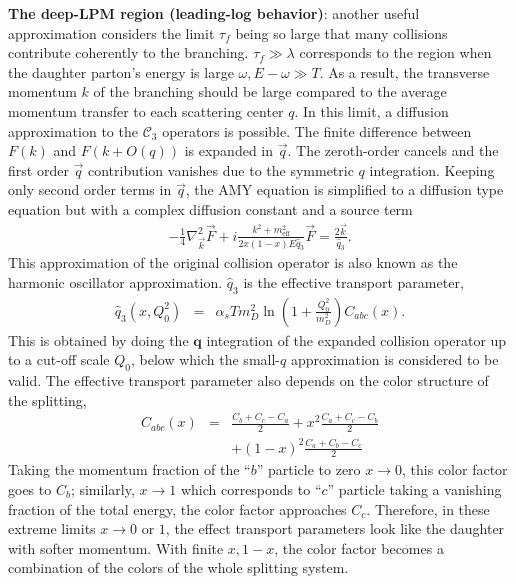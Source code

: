 {\bf The deep-LPM region (leading-log behavior)}: another useful approximation considers the limit $\tau_f$ being so large that many collisions contribute coherently to the branching. 
$\tau_f \gg \lambda$ corresponds to the region when the daughter parton's energy is large $\omega, E-\omega \gg T$.
As a result, the transverse momentum $k$ of the branching should be large compared to the average momentum transfer to each scattering center $q$.
In this limit, a diffusion approximation to the $\mathcal{C}_3$ operators is possible.
The finite difference between $F(k)$ and $F(k+O(q))$ is expanded in $\vec{q}$. 
The zeroth-order cancels and the first order $\vec{q}$ contribution vanishes due to the symmetric $q$ integration.
Keeping only second order terms in $\vec{q}$, the AMY equation is simplified to a diffusion type equation but with a complex diffusion constant and a source term \cite{Arnold:2008zu}
\begin{eqnarray}
- \frac{1}{4} \nabla^2_{\vec{k}}\vec{F} + i\frac{k^2 + m^2_{\textrm{eff}}}{2x(1-x)E\hat{q}_3}\vec{F} = \frac{2\vec{k}}{\hat{q}_3}.
\end{eqnarray}
This approximation of the original collision operator is also known as the harmonic oscillator approximation.
$\hat{q}_3$ is the effective transport parameter,
\begin{eqnarray}
\hat{q}_3(x, Q_0^2) &=& \alpha_s T m_D^2 \ln\left(1+\frac{Q_0^2}{m_D^2}\right) C_{abc}(x).\label{eq:qhat3}
\end{eqnarray}
This is obtained by doing the $\mathbf{q}$ integration of the expanded collision operator up to a cut-off scale $Q_0$, below which the small-$q$ approximation is considered to be valid.
The effective transport parameter also depends on the color structure of the splitting,
\begin{eqnarray}
C_{abc}(x) &=&  \frac{C_b+C_c-C_a}{2} + x^2 \frac{C_a+C_c-C_b}{2} \\
&&+(1-x)^2\frac{C_a+C_b-C_c}{2}
\end{eqnarray}
Taking the momentum fraction of the ``$b$'' particle to zero $x\rightarrow 0$, this color factor goes to $C_b$; similarly, $x\rightarrow 1$ which corresponds to ``$c$'' particle taking a vanishing fraction of the total energy, the color factor approaches $C_c$.
Therefore, in these extreme limits $x\rightarrow 0$ or $1$, the effect transport parameters look like the daughter with softer momentum.
With finite $x, 1-x$, the color factor becomes a combination of the colors of the whole splitting system.

